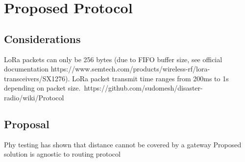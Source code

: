 \chapter{Proposed Protocol}
\section{Considerations}
LoRa packets can only be 256 bytes (due to FIFO buffer size, see official documentation https://www.semtech.com/products/wireless-rf/lora-transceivers/SX1276).
LoRa packet transmit time ranges from 200ms to 1s depending on packet size.\
https://github.com/sudomesh/disaster-radio/wiki/Protocol
\section{Proposal}
%

Phy testing has shown that distance cannot be covered by a gateway
Proposed solution is agnostic to routing protocol